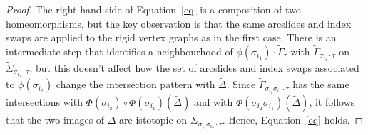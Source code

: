 \documentclass[10pt,a4paper]{amsart}
\def\ws{\widetilde{\Sigma}}
\begin{document}
\begin{proof}
The right-hand side of Equation~\ref{eq} is a composition of two homeomorphisms, but the key observation is that the same arcslides and index swaps are applied to the rigid vertex graphs as in the first case.  There is an intermediate step that identifies a neighbourhood of $\phi(\sigma_{i_1})\cdot \widetilde{\Gamma}_\tau$ with $\widetilde{\Gamma}_{\sigma_{i_1}\cdot \tau}$ on $\widetilde{\Sigma}_{\sigma_{i_1}\cdot \tau}$, but this doesn't affect how the set of arcslides and index swaps associated to $\phi(\sigma_{i_2})$ change the intersection pattern with $\widetilde{\Delta}$.  Since  $\widetilde{\Gamma}_{\sigma_{i_2}\sigma_{i_1}\cdot \tau}$ has the same intersections with  $\Phi(\sigma_{i_2})\circ \Phi(\sigma_{i_1})(\widetilde{\Delta})$ and with $\Phi(\sigma_{i_2}\sigma_{i_1})(\widetilde{\Delta})$, it follows that the two images of $\widetilde{\Delta}$ are istotopic on $\ws_{\sigma_{i_1}\sigma_{i_2}\cdot \tau}$.  Hence, Equation~\ref{eq} holds.



\end{proof}
\end{document}
